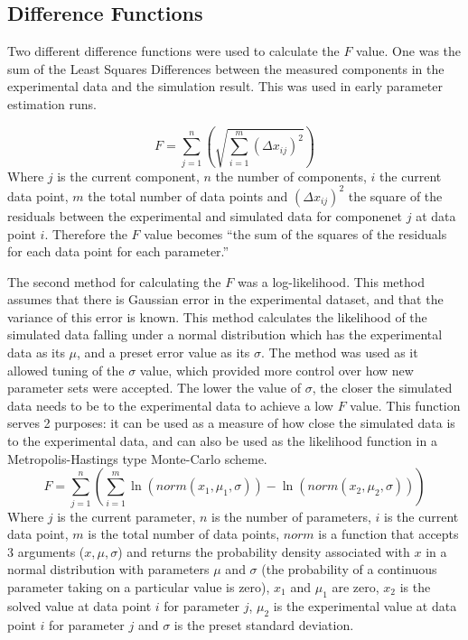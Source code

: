 \subsection{Difference Functions}
Two different difference functions were used to calculate the $F$ value. One was the sum of the Least Squares Differences between the measured components in the experimental data and the simulation result. This was used in early parameter estimation runs.

\begin{equation}
F = \sum^{n}_{j=1}\left(\sqrt{\sum^{m}_{i=1} (\Delta x_{ij})^2}\right)
\end{equation}
Where $j$ is the current component, $n$ the number of components, $i$ the current data point, $m$ the total number of data points and $(\Delta x_{ij})^2$ the square of the residuals between the experimental and simulated data for componenet $j$ at data point $i$. Therefore the $F$ value becomes ``the sum of the squares of the residuals for each data point for each parameter.''

The second method for calculating the $F$ was a log-likelihood. This method assumes that there is Gaussian error in the experimental dataset, and that the variance of this error is known. This method calculates the likelihood of the simulated data falling under a normal distribution which has the experimental data as its $\mu$, and a preset error value as its $\sigma$. The method was used as it allowed tuning of the $\sigma$ value, which provided more control over how new parameter sets were accepted. The lower the value of $\sigma$, the closer the simulated data needs to be to the experimental data to achieve a low $F$ value. This function serves 2 purposes: it can be used as a measure of how close the simulated data is to the experimental data, and can also be used as the likelihood function in a Metropolis-Hastings type Monte-Carlo scheme.
\begin{equation}
F = \sum^{n}_{j=1}\left(\sum^{m}_{i=1}\ln(norm(x_1,\mu_1,\sigma)) - \ln(norm(x_2,\mu_2,\sigma))\right)
\end{equation}
Where $j$ is the current parameter, $n$ is the number of parameters, $i$ is the current data point, $m$ is the total number of data points, $norm$ is a function that accepts 3 arguments ($x, \mu, \sigma$) and returns the probability density associated with $x$ in a normal distribution with parameters $\mu$ and $\sigma$ (the probability of a continuous parameter taking on a particular value is zero), $x_1$ and $\mu_1$ are zero, $x_2$ is the solved value at data point $i$ for parameter $j$, $\mu_2$ is the experimental value at data point $i$ for parameter $j$ and $\sigma$ is the preset standard deviation.

